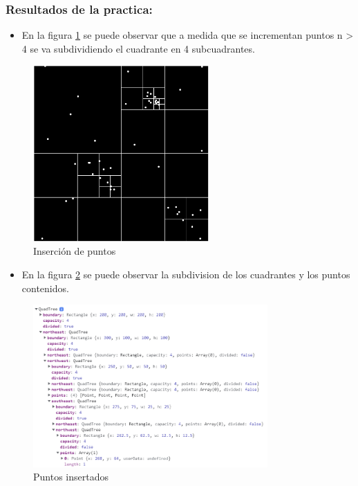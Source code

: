 \documentclass{article}
\begin{document}
\subsubsection{Resultados de la practica: }

\begin{itemize}
\item En la figura \ref{fig:quadtree_insert} se puede observar que a medida que se incrementan puntos n > 4 se va subdividiendo el cuadrante en 4 subcuadrantes.
\end{itemize}

\begin{figure}[htbp]
\centering
\includegraphics[width=0.6\textwidth]{img/quadtree_insert.png}
\caption{Inserción de puntos}
\label{fig:quadtree_insert}
\end{figure}

\begin{itemize}
\item En la figura \ref{fig:quadtree_insert_data} se puede observar la subdivision de los cuadrantes y los puntos contenidos.
\end{itemize}

\begin{figure}[htbp]
\centering
\includegraphics[width=0.8\textwidth]{img/quadtree_insert_data.png}
\caption{Puntos insertados}
\label{fig:quadtree_insert_data}
\end{figure}
\end{document}
